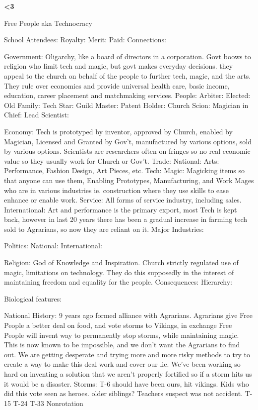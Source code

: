\documentclass[blue]{GL2020}
\begin{document}
\name{\bTest{}}

\bf{<3}

Free People aka Technocracy

School Attendees:
	Royalty:
	Merit:
	Paid:
	Connections:

Government:  Oligarchy, like a board of directors in a corporation.  Govt boows to religion who limit tech and magic, but govt makes everyday decisions.  they appeal to the church on behalf of the people to further tech, magic, and the arts.  They rule over economics and provide universal health care, basic income, education, career placement and matchmaking services.
	People:		Arbiter:
						Elected:
						Old Family:
						Tech Star:
						Guild Master:
						Patent Holder:
						Church Scion:
						Magician in Chief:
						Lead Scientist:
	
Economy:		Tech is prototyped by inventor, approved by Church, enabled by Magician, Licensed and Granted 
						by Gov't, manufactured by various options, sold by various options.  Scientists are researchers often on fringes so no real economic value so they usually work for Church or Gov't.
	Trade:		National:		Arts:		Performance, Fashion Design, Art Pieces, etc.
												Tech:		
												Magic:		Magicking items so that anyone can use them, Enabling Prototypes,
												Manufacturing, and Work Mages who are in various industries ie. construction 
												where they use skills to ease enhance or enable work.
												Service:		All forms of service industry, including sales.
						International:		Art and performance is the primary export, most Tech is kept back, however in last 20 years there has been a gradual increase in farming tech sold to Agrarians, so now they are reliant on it.
	Major Industries:
	
Politics:
	National:
	International:
	
Religion:		God of Knowledge and Inspiration.  Church strictly regulated use of magic, limitations on technology.  They do this supposedly in the interest of maintaining freedom and equality for the people.  
	Consequences:
	Hierarchy:
	
	
Biological features:

National History:		9 years ago formed alliance with Agrarians.  Agrarians give Free People a better deal on food, and vote storms to Vikings, in exchange Free People will invent way to permanently stop storms, while maintaining magic.  This is now known to be impossible, and we don't want the Agrarians to find out.  We are getting desperate and trying more and more risky methods to try to create a way to make this deal work and cover our lie.  We've been working so hard on inventing a solution that we aren't properly fortified so if a storm hits us it would be a disaster.
	Storms:		T-6 should have been ours, hit vikings.  Kids who did this vote seen as heroes.  older siblings?  Teachers suspect was not accident.
						T-15
						T-24
						T-33
						Nonrotation
	
\end{document}
